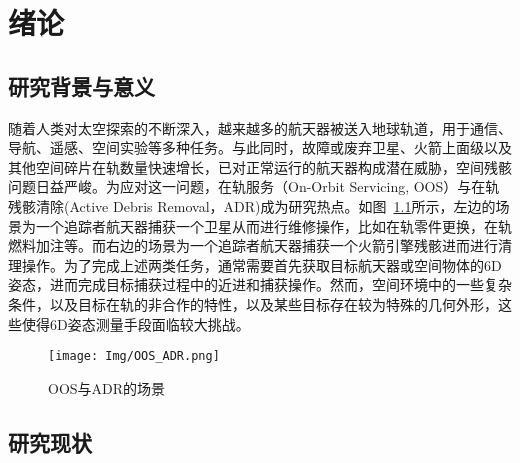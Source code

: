\chapter{绪论}
\section{研究背景与意义}
随着人类对太空探索的不断深入，越来越多的航天器被送入地球轨道，用于通信、导航、遥感、空间实验等多种任务\cite{prol2022position,zhao2022overview,nozawa2023extent}。与此同时，故障或废弃卫星、火箭上面级以及其他空间碎片在轨数量快速增长，已对正常运行的航天器构成潜在威胁，空间残骸问题日益严峻\cite{debris1,debris2}。为应对这一问题，在轨服务（On-Orbit Servicing, OOS）\cite{ma2023advances,nwac129,asri2024introductory,wang2023bridging}与在轨残骸清除(Active Debris Removal，ADR)成为研究热点\cite{BARANOV2024100982,CREASER2024481,BAREA20243060,WANG2025}。如图~\ref{fig:OOS_ADR}所示，左边的场景为一个追踪者航天器捕获一个卫星从而进行维修操作，比如在轨零件更换，在轨燃料加注等。而右边的场景为一个追踪者航天器捕获一个火箭引擎残骸进而进行清理操作。为了完成上述两类任务，通常需要首先获取目标航天器或空间物体的6D姿态，进而完成目标捕获过程中的近进和捕获操作。然而，空间环境中的一些复杂条件\cite{aerospace10120997}，以及目标在轨的非合作的特性\cite{PAULY2023339}，以及某些目标存在较为特殊的几何外形，这些使得6D姿态测量手段面临较大挑战。
\begin{figure}[htbp]
	\centering
	\texttt{[image: Img/OOS\_ADR.png]}
	\caption{OOS与ADR的场景}
	\label{fig:OOS_ADR}
\end{figure}

\section{研究现状}
